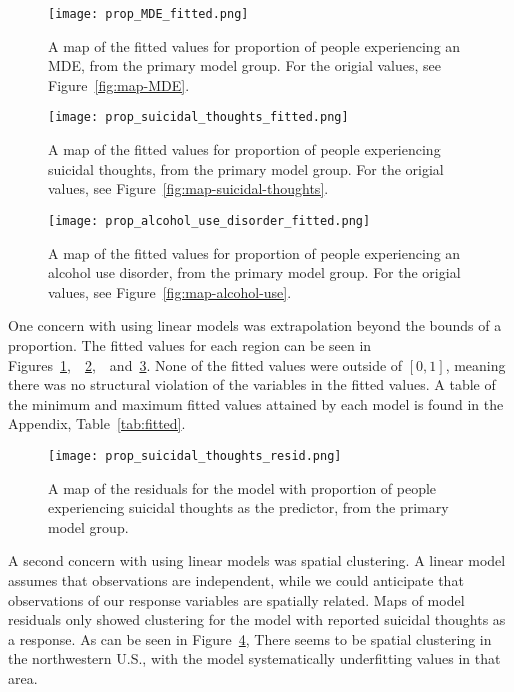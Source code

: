 \documentclass{article}
\begin{document}
\begin{figure}[!htb]
    \centering
    \texttt{[image: prop\_MDE\_fitted.png]}
    \caption{\label{fig:map-fitted-MDE}
    A map of the fitted values for proportion of people experiencing an
    MDE, from the primary model group. For the origial values, see
    Figure~\ref{fig:map-MDE}.}
\end{figure}

\begin{figure}[!htb]
    \centering
    \texttt{[image: prop\_suicidal\_thoughts\_fitted.png]}
    \caption{\label{fig:map-fitted-suicidal-thoughts}
    A map of the fitted values for proportion of people experiencing
    suicidal thoughts, from the primary model group. For the origial values, see
    Figure~\ref{fig:map-suicidal-thoughts}.}
\end{figure}

\begin{figure}[!htb]
    \centering
    \texttt{[image: prop\_alcohol\_use\_disorder\_fitted.png]}
    \caption{\label{fig:map-fitted-alcohol-use}A map of the fitted values for proportion of people experiencing an
    alcohol use disorder, from the primary model group.
    For the origial values, see Figure~\ref{fig:map-alcohol-use}.}
\end{figure}

One concern with using linear models was extrapolation
beyond the bounds of a proportion.
The fitted values for each region can be seen in
Figures~\ref{fig:map-fitted-MDE},\
~\ref{fig:map-fitted-suicidal-thoughts},\
~and~\ref{fig:map-fitted-alcohol-use}.
None of the fitted values were outside of $[0,1]$,
meaning there was no structural violation of the
variables in the fitted values.
A table of the minimum and maximum fitted values
attained by each model is found in the Appendix,
Table~\ref{tab:fitted}.

\begin{figure}[!htb]
    \centering
    \texttt{[image: prop\_suicidal\_thoughts\_resid.png]}
    \caption{\label{fig:map-resid-suicidal-thoughts}A map of the residuals
    for the model with
    proportion of people experiencing
    suicidal thoughts as the predictor,
    from the primary model group.
    }
\end{figure}

A second concern with using linear models was spatial clustering.
A linear model assumes that observations are independent,
while we could anticipate that observations of our response variables
are spatially related.
Maps of model residuals only showed clustering for
the model with reported suicidal thoughts as a response.
As can be seen in Figure~\ref{fig:map-resid-suicidal-thoughts},
There seems to be spatial clustering
in the northwestern U.S.,
with the model systematically underfitting values
in that area.
\end{document}
